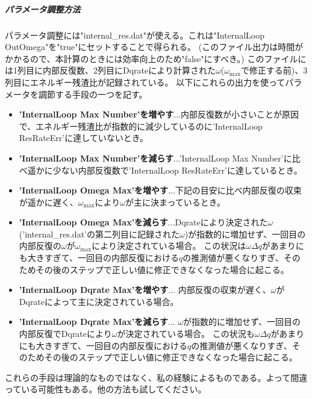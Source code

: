 \documentclass{jsarticle}
\begin{document}
\subparagraph{パラメータ調整方法}
パラメータ調整には"internal\_res.dat"が使える。これは"InternalLoop OutOmega"を"true"にセットすることで得られる。
(このファイル出力は時間がかかるので、本計算のときには効率向上のため"false"にすべき。)
このファイルには1列目に内部反復数、2列目にDqrateにより計算された$\omega$($\omega_{\max}$で修正する前)、3列目にエネルギー残渣比が記録されている。
以下にこれらの出力を使ってパラメータを調節する手段の一つを記す。
\begin{itemize}
\item \textbf{'InternalLoop Max Number'を増やす}...内部反復数が小さいことが原因で、エネルギー残渣比が指数的に減少しているのに'InternalLoop ResRateErr'に達していないとき。
\item \textbf{'InternalLoop Max Number'を減らす}...'InternalLoop Max Number'に比べ遥かに少ない内部反復数で'InternalLoop ResRateErr'に達しているとき。
\item \textbf{'InternalLoop Omega Max'を増やす}...下記の目安に比べ内部反復の収束が遥かに遅く、$\omega_{\max}$により$\omega$が主に決まっているとき。
\item \textbf{'InternalLoop Omega Max'を減らす}...Dqrateにより決定された$\omega$('internal\_res.dat'の第二列目に記録された$\omega$)が指数的に増加せず、一回目の内部反復の$\omega$が$\omega _{\max}$により決定されている場合。
この状況は$\omega\Delta q$があまりにも大きすぎて、一回目の内部反復における$q$の推測値が悪くなりすぎ、そのためその後のステップで正しい値に修正できなくなった場合に起こる。
\item \textbf{'InternalLoop Dqrate Max'を増やす}...
内部反復の収束が遅く、$\omega$がDqrateによって主に決定されている場合。
\item \textbf{'InternalLoop Dqrate Max'を減らす}...
$\omega$が指数的に増加せず、一回目の内部反復でDqrateにより$\omega$が決定されている場合。
この状況も$\omega\Delta q$があまりにも大きすぎて、一回目の内部反復における$q$の推測値が悪くなりすぎ、そのためその後のステップで正しい値に修正できなくなった場合に起こる。
\end{itemize}
これらの手段は理論的なものではなく、私の経験によるものである。よって間違っている可能性もある。他の方法も試してください。
\end{document}
